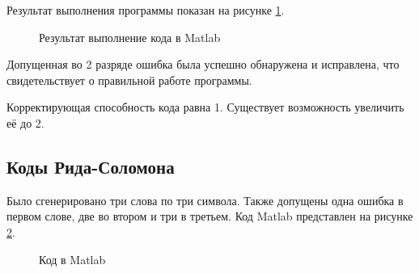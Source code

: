 \documentclass[a4paper,14pt]{extarticle}
\begin{document}
Результат выполнения программы показан на рисунке \ref{10}.

\begin{figure}[H]
\caption{Результат выполнение кода в Matlab}
\label{10}
\end{figure}

Допущенная во 2 разряде ошибка была успешно обнаружена и исправлена, что свидетельствует о правильной работе программы.

Корректирующая способность кода равна 1. Существует возможность увеличить её до 2.

\newpage
\subsection{Коды Рида-Соломона}

Было сгенерировано три слова по три символа. Также допущены одна ошибка в первом слове, две во втором и три в третьем.
Код Matlab представлен на рисунке \ref{11}.

\begin{figure}[H]
\caption{Код в Matlab}
\label{11}
\end{figure}
\end{document}
